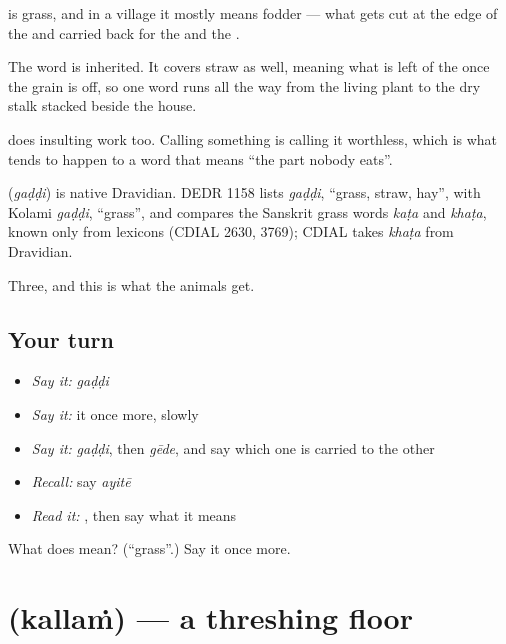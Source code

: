  is grass, and in a village it mostly means fodder — what gets cut at the edge of the  and carried back for the  and the .

The word is inherited. It covers straw as well, meaning what is left of the  once the grain is off, so one word runs all the way from the living plant to the dry stalk stacked beside the house.

 does insulting work too. Calling something  is calling it worthless, which is what tends to happen to a word that means \textquotedblleft{}the part nobody eats\textquotedblright{}.

\begin{cousinweb}
\textbf{} (\emph{gaḍḍi}) is native Dravidian. DEDR 1158 lists \emph{gaḍḍi}, \textquotedblleft{}grass, straw, hay\textquotedblright{}, with Kolami \emph{gaḍḍi}, \textquotedblleft{}grass\textquotedblright{}, and compares the Sanskrit grass words \emph{kaṭa} and \emph{khaṭa}, known only from lexicons (CDIAL 2630, 3769); CDIAL takes \emph{khaṭa} from Dravidian.
\end{cousinweb}

\begin{grammarlens}[title={What you've built}]
Three, and this is what the animals get.
\end{grammarlens}

\subsection*{Your turn}
\begin{itemize}
\raggedright
  \item \emph{Say it:} \emph{gaḍḍi}
  \item \emph{Say it:} it once more, slowly
  \item \emph{Say it:} \emph{gaḍḍi}, then \emph{gēde}, and say which one is carried to the other
  \item \emph{Recall:} say \emph{ayitē}
  \item \emph{Read it:} \textbf{}, then say what it means
\end{itemize}

\begin{tcolorbox}[breakable,colback=teal!4,colframe=teal!35!black,title={Before you move on}]
What does  mean? (\textquotedblleft{}grass\textquotedblright{}.) Say it once more.
\end{tcolorbox}
\section[\texorpdfstring{\te{కల్లం} (kallaṁ)}{కల్లం (kallaṁ)}]{ (kallaṁ) — a threshing floor}

